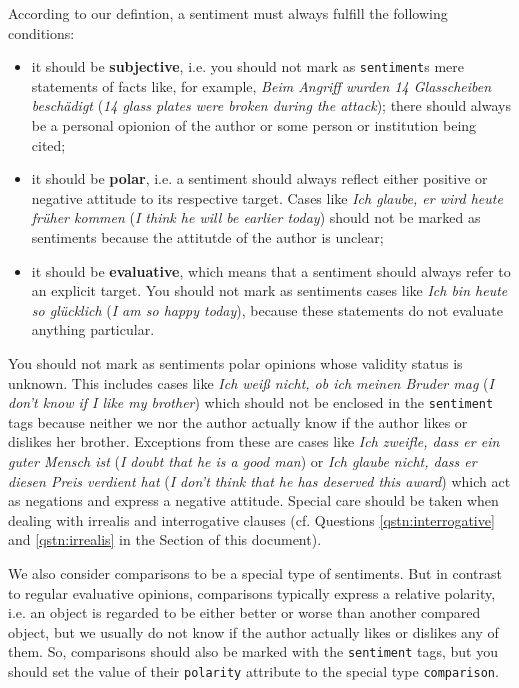 \documentclass[11pt,a4paper]{article}
\theoremstyle{mytheoremstyle}
\begin{document}
According to our defintion, a sentiment must always fulfill the
following conditions:
\begin{itemize}
\item it should be \textbf{subjective}, i.e. you should not mark as
  \texttt{sentiment}s mere statements of facts like, for example,
  \textit{Beim Angriff wurden 14 Glasscheiben besch\"adigt}
  (\textit{14 glass plates were broken during the attack}); there
  should always be a personal opionion of the author or some person or
  institution being cited;

\item it should be \textbf{polar}, i.e. a sentiment should always
  reflect either positive or negative attitude to its respective
  target.  Cases like \textit{Ich glaube, er wird heute fr\"uher
    kommen} (\textit{I think he will be earlier today}) should not be
  marked as sentiments because the attitutde of the author is unclear;

\item it should be \textbf{evaluative}, which means that a sentiment
  should always refer to an explicit target.  You should not mark as
  sentiments cases like \textit{Ich bin heute so gl\"ucklich}
  (\textit{I am so happy today}), because these statements do not
  evaluate anything particular.
\end{itemize}

You should not mark as sentiments polar opinions whose validity status
is unknown.  This includes cases like \textit{Ich wei\ss{} nicht, ob
  ich meinen Bruder mag} (\textit{I don't know if I like my brother})
which should not be enclosed in the \texttt{sentiment} tags because
neither we nor the author actually know if the author likes or
dislikes her brother.  Exceptions from these are cases like
\textit{Ich zweifle, dass er ein guter Mensch ist} (\textit{I doubt
  that he is a good man}) or \textit{Ich glaube nicht, dass er diesen
  Preis verdient hat} (\textit{I don't think that he has deserved this
  award}) which act as negations and express a negative attitude.
Special care should be taken when dealing with irrealis and
interrogative clauses (cf. Questions \ref{qstn:interrogative} and
\ref{qstn:irrealis} in the  Section of this
document).

We also consider comparisons to be a special type of sentiments.  But
in contrast to regular evaluative opinions, comparisons typically
express a relative polarity, i.e. an object is regarded to be either
better or worse than another compared object, but we usually do not
know if the author actually likes or dislikes any of them.  So,
comparisons should also be marked with the \texttt{sentiment} tags,
but you should set the value of their \texttt{polarity} attribute to
the special type \texttt{comparison}.
\end{document}
